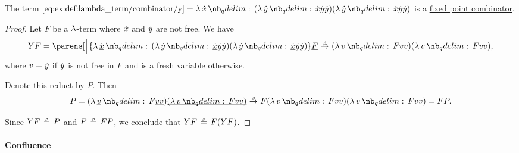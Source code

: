 \begin{proposition}\label{thm:y_is_a_fixed_point_combinator}
  The term \( \ref{eq:ex:def:lambda_term/combinator/y} = \qabs \synx (\qabs \syny \synx \syny \syny) (\qabs \syny \synx \syny \syny) \) is a \hyperref[def:fixed_point_combinator]{fixed point combinator}.
\end{proposition}
\begin{proof}
  Let \( F \) be a \( \mathrm{\lambda} \)-term where \( {\dot{x}} \) and \( {\dot{y}} \) are not free. We have
  \begin{equation*}
    YF
    =
    \parens[\Big]{ \qabs {\hi{\synx}} (\qabs \syny \hi{\synx} \syny \syny) (\qabs \syny \hi{\synx} \syny \syny) } \hi{F}
    \bred
    (\qabs v F v v) (\qabs v F v v),
  \end{equation*}
  where \( v = {\dot{y}} \) if \( {\dot{y}} \) is not free in \( F \) and is a fresh variable otherwise.

  Denote this reduct by \( P \). Then
  \begin{equation*}
    P =
    (\qabs {\hi{v}} F \hi{v} \hi{v}) \hi{(\qabs v F v v)}
    \bred
    F (\qabs v F v v) (\qabs v F v v)
    =
    FP.
  \end{equation*}

  Since \( YF \bequiv P \) and \( P \bequiv FP \), we conclude that \( YF \bequiv F(YF) \).
\end{proof}

\paragraph{Confluence}

